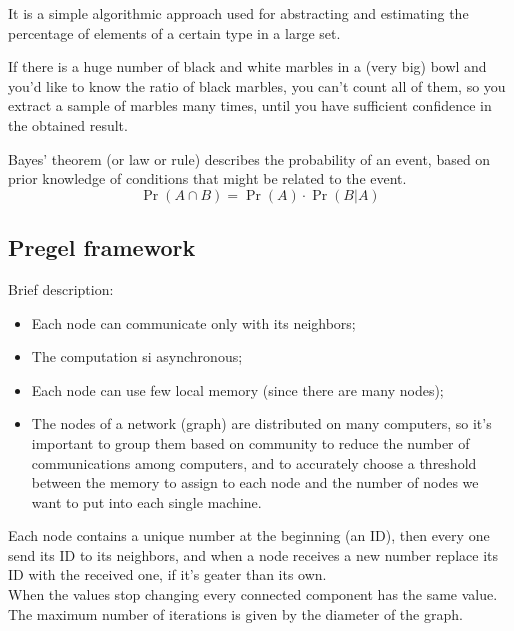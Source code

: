     \begin{defn}[Sampling]
        It is a simple algorithmic approach used for abstracting and estimating the percentage of elements of a certain type in a large set.
        
        \ex If there is a huge number of black and white marbles in a (very big) bowl and you'd like to know the ratio of black marbles, you can't count all of them, so you extract a sample of marbles many times, until you have sufficient confidence in the obtained result.
    \end{defn}
    
    \begin{defn}
        Bayes’ theorem (or law or rule) describes the probability of an event, based on prior knowledge of conditions that might be related to the event.
        \begin{equation}\label{eq-bayes}
            \Pr{(A \cap B)} = \Pr{(A)} \cdot \Pr{(B | A)}
        \end{equation}
    \end{defn}


\subsection{Pregel framework}

    Brief description:
    \begin{itemize}
        \item Each node can communicate only with its neighbors;
        \item The computation si asynchronous;
        \item Each node can use few local memory (since there are many nodes);
        \item The nodes of a network (graph) are distributed on many computers, so it's important to group them based on community to reduce the number of communications among computers, and to accurately choose a threshold between the memory to assign to each node and the number of nodes we want to put into each single machine.
    \end{itemize}
    
    \begin{ex}
        Each node contains a unique number at the beginning (an ID), then every one send its ID to its neighbors, and when a node receives a new number replace its ID with the received one, if it's geater than its own. \\
        When the values stop changing every connected component has the same value.
        The maximum number of iterations is given by the diameter of the graph.
    \end{ex}


